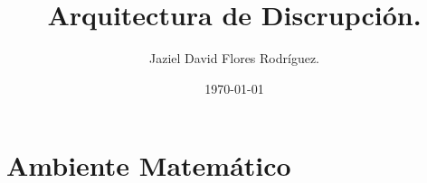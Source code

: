 \documentclass[12pt]{article}
\author{Jaziel David Flores Rodríguez.}
\date{\today}
\title{Arquitectura de Discrupción.}
\begin{document}
\maketitle

\section{Ambiente Matem\'atico}
\end{document}

